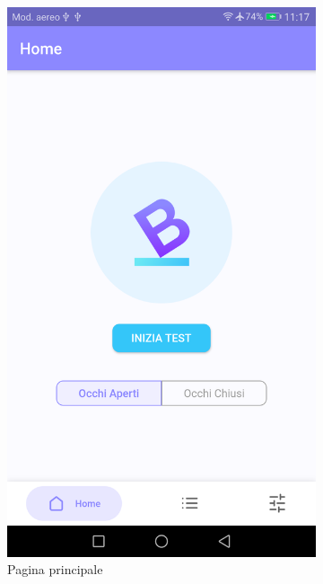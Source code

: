 \begin{figure}
  \centering
  \begin{subfigure}[b]{0.33\textwidth}
      \includegraphics[width=\textwidth]{figures/screenshot/home.png}
      \caption{Pagina principale}
      \label{fig:home}
  \end{subfigure}
  \hspace{0.15\textwidth}%
  \begin{subfigure}[b]{0.33\textwidth}

\end{subfigure}
\end{figure}
